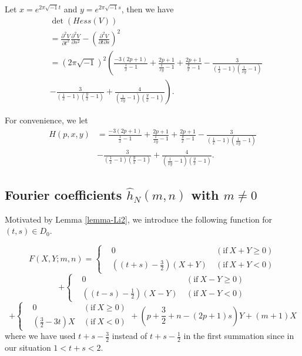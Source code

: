 \documentclass[12pt]{amsart}
\begin{document}
Let $x=e^{2\pi\sqrt{-1}t}$ and $y=e^{2\pi \sqrt{-1}s}$, then we have
\begin{align} \label{formula-hessV}
    &\det(Hess(V))\\\nonumber
    &=\frac{\partial^2 V}{\partial t^2}\frac{\partial^2 V}{\partial s^2}-\left(\frac{\partial^2 V}{\partial t\partial s}\right)^2\\\nonumber
    &=(2\pi\sqrt{-1})^2\left(\frac{-3(2p+1)}{\frac{1}{x}-1}+\frac{2p+1}{\frac{1}{xy}-1}+\frac{2p+1}{\frac{y}{x}-1}-\frac{3}{(\frac{1}{x}-1)(\frac{1}{xy}-1)}\right.\\\nonumber
    &\left.-\frac{3}{(\frac{1}{x}-1)(\frac{y}{x}-1)}+\frac{4}{(\frac{1}{xy}-1)(\frac{y}{x}-1)}\right).
\end{align}

For convenience, we let 
\begin{align}
    H(p,x,y)&=\frac{-3(2p+1)}{\frac{1}{x}-1}+\frac{2p+1}{\frac{1}{xy}-1}+\frac{2p+1}{\frac{y}{x}-1}-\frac{3}{(\frac{1}{x}-1)(\frac{1}{xy}-1)}\\\nonumber
    &-\frac{3}{(\frac{1}{x}-1)(\frac{y}{x}-1)}+\frac{4}{(\frac{1}{xy}-1)(\frac{y}{x}-1)}.
\end{align}


\subsection{Fourier coefficients $\hat{h}_N(m,n)$ with $m\neq 0$} \label{subsection-mneq0}
Motivated by Lemma \ref{lemma-Li2}, we introduce the following  function for $(t,s)\in D_0$.

\begin{equation} \label{eq:2}
F(X,Y;m,n)=\left\{ \begin{aligned}
         &0  &  \ (\text{if} \ X+Y\geq 0) \\
         &\left((t+s)-\frac{3}{2}\right)(X+Y) & \ (\text{if} \ X+Y<0)
                          \end{aligned} \right.
                          \end{equation}
\begin{equation*}
 +\left\{ \begin{aligned}
         &0  &  \ (\text{if} \ X-Y\geq 0) \\
         &\left((t-s)-\frac{1}{2}\right)(X-Y) & \ (\text{if} \ X-Y<0)
                          \end{aligned} \right.
                          \end{equation*}
\begin{equation*}
+\left\{ \begin{aligned}
         &0  &  \ (\text{if} \ X\geq 0) \\
         &\left(\frac{3}{2}-3t\right)X & \ (\text{if} \ X<0)
                          \end{aligned} \right.  +\left(p+\frac{3}{2}+n-(2p+1)s\right)Y+(m+1)X
                          \end{equation*}
where we have used $t+s-\frac{3}{2}$ instead of $t+s-\frac{1}{2}$ in the first summation since in our situation $1<t+s<2$.                       
\end{document}
